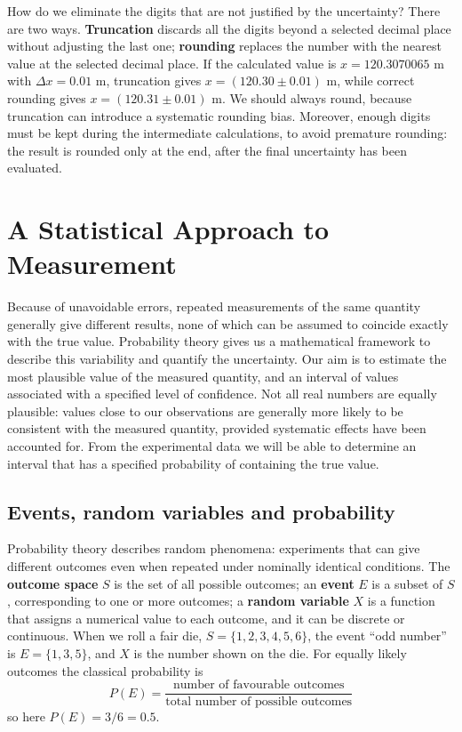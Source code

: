 \documentclass[letterpaper,11pt,leqno]{book}
\begin{document}
How do we eliminate the digits that are not justified by the uncertainty? There are two ways. \textbf{Truncation} discards all the digits beyond a selected decimal place without adjusting the last one; \textbf{rounding} replaces the number with the nearest value at the selected decimal place. If the calculated value is $x = 120.3070065\text{ m}$ with $\Delta x = 0.01\text{ m}$, truncation gives $x = (120.30 \pm 0.01)\text{ m}$, while correct rounding gives $x = (120.31 \pm 0.01)\text{ m}$. We should always round, because truncation can introduce a systematic rounding bias. Moreover, enough digits must be kept during the intermediate calculations, to avoid premature rounding: the result is rounded only at the end, after the final uncertainty has been evaluated.

\section{A Statistical Approach to Measurement}
\label{sec:probability}

Because of unavoidable errors, repeated measurements of the same quantity generally give different results, none of which can be assumed to coincide exactly with the true value. Probability theory gives us a mathematical framework to describe this variability and quantify the uncertainty. Our aim is to estimate the most plausible value of the measured quantity, and an interval of values associated with a specified level of confidence. Not all real numbers are equally plausible: values close to our observations are generally more likely to be consistent with the measured quantity, provided systematic effects have been accounted for. From the experimental data we will be able to determine an interval that has a specified probability of containing the true value.

\subsection{Events, random variables and probability}

Probability theory describes random phenomena: experiments that can give different outcomes even when repeated under nominally identical conditions. The \textbf{outcome space} $S$ is the set of all possible outcomes; an \textbf{event} $E$ is a subset of $S$, corresponding to one or more outcomes; a \textbf{random variable} $X$ is a function that assigns a numerical value to each outcome, and it can be discrete or continuous. When we roll a fair die, $S = \{1, 2, 3, 4, 5, 6\}$, the event ``odd number'' is $E = \{1, 3, 5\}$, and $X$ is the number shown on the die. For equally likely outcomes the classical probability is
\begin{equation}
\boxed{P(E) = \frac{\text{number of favourable outcomes}}{\text{total number of possible outcomes}}}
\label{eq:classical_probability}
\end{equation}
so here $P(E) = 3/6 = 0.5$.
\end{document}
